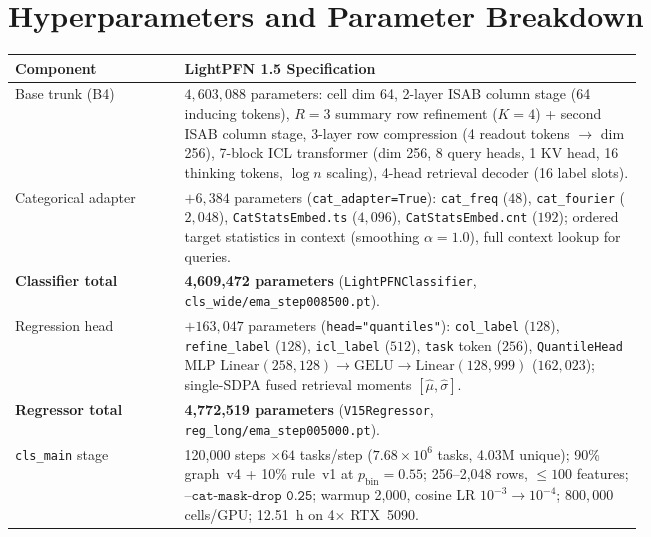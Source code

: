 \documentclass[11pt]{article}
\begin{document}
\clearpage
\appendix
\section{Hyperparameters and Parameter Breakdown}
\label{app:hyperparams}

\begin{table}[h]
\centering
\small
\begin{tabular}{lp{0.73\linewidth}}
\toprule
\textbf{Component} & \textbf{LightPFN 1.5 Specification} \\
\midrule
Base trunk (B4) & {\raggedright $4{,}603{,}088$ parameters: cell dim 64, 2-layer ISAB column stage (64 inducing tokens), $R=3$ summary row refinement ($K=4$) + second ISAB column stage, 3-layer row compression (4 readout tokens $\to$ dim 256), 7-block ICL transformer (dim 256, 8 query heads, 1 KV head, 16 thinking tokens, $\log n$ scaling), 4-head retrieval decoder (16 label slots).\par} \\
Categorical adapter & {\raggedright $+6{,}384$ parameters (\texttt{cat\_adapter=True}): \texttt{cat\_freq} ($48$), \texttt{cat\_fourier} ($2{,}048$), \texttt{CatStatsEmbed.ts} ($4{,}096$), \texttt{CatStatsEmbed.cnt} ($192$); ordered target statistics in context (smoothing $\alpha=1.0$), full context lookup for queries.\par} \\
\textbf{Classifier total} & {\raggedright \textbf{4,609,472 parameters} (\texttt{LightPFNClassifier}, \texttt{cls\_wide/ema\_step008500.pt}).\par} \\
Regression head & {\raggedright $+163{,}047$ parameters (\texttt{head="quantiles"}): \texttt{col\_label} ($128$), \texttt{refine\_label} ($128$), \texttt{icl\_label} ($512$), \texttt{task} token ($256$), \texttt{QuantileHead} MLP $\mathrm{Linear}(258,128)\to\mathrm{GELU}\to\mathrm{Linear}(128,999)$ ($162{,}023$); single-SDPA fused retrieval moments $[\hat{\mu},\hat{\sigma}]$.\par} \\
\textbf{Regressor total} & {\raggedright \textbf{4,772,519 parameters} (\texttt{V15Regressor}, \texttt{reg\_long/ema\_step005000.pt}).\par} \\
\midrule
\texttt{cls\_main} stage & {\raggedright 120,000 steps $\times 64$ tasks/step ($7.68\times 10^6$ tasks, 4.03M unique); 90\% graph~v4 + 10\% rule~v1 at $p_{\mathrm{bin}}=0.55$; 256--2,048 rows, $\le 100$ features; $\texttt{--cat-mask-drop 0.25}$; warmup 2,000, cosine LR $10^{-3}\to 10^{-4}$; $800{,}000$ cells/GPU; 12.51~h on 4$\times$ RTX~5090.\par} \\

\end{tabular}
\end{table}
\end{document}
